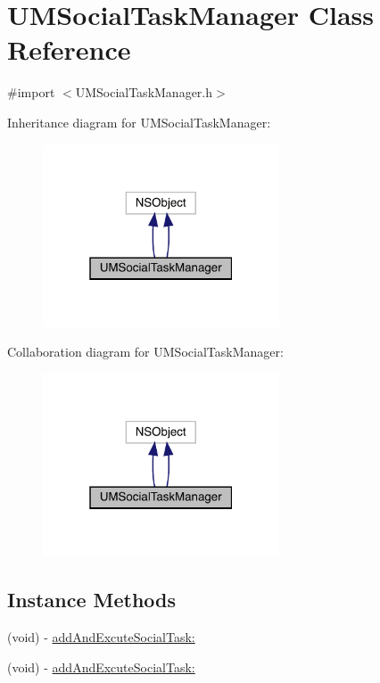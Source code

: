 \hypertarget{interface_u_m_social_task_manager}{}\section{U\+M\+Social\+Task\+Manager Class Reference}
\label{interface_u_m_social_task_manager}


{\ttfamily \#import $<$U\+M\+Social\+Task\+Manager.\+h$>$}



Inheritance diagram for U\+M\+Social\+Task\+Manager\+:\nopagebreak
\begin{figure}[H]
\begin{center}
\leavevmode
\includegraphics[width=199pt]{interface_u_m_social_task_manager__inherit__graph}
\end{center}
\end{figure}


Collaboration diagram for U\+M\+Social\+Task\+Manager\+:\nopagebreak
\begin{figure}[H]
\begin{center}
\leavevmode
\includegraphics[width=199pt]{interface_u_m_social_task_manager__coll__graph}
\end{center}
\end{figure}
\subsection*{Instance Methods}
\begin{DoxyCompactItemize}
\item 
(void) -\/ \mbox{\hyperlink{interface_u_m_social_task_manager_ae418b6523f6d17a36844d3942522718e}{add\+And\+Excute\+Social\+Task\+:}}
\item 
(void) -\/ \mbox{\hyperlink{interface_u_m_social_task_manager_ae418b6523f6d17a36844d3942522718e}{add\+And\+Excute\+Social\+Task\+:}}
\end{DoxyCompactItemize}
